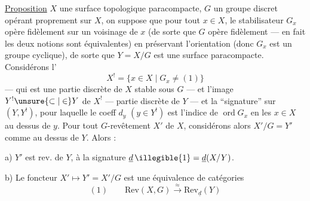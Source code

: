 \uline{Proposition} 
$X$ une surface topologique\unsure{${}^{*}$} paracompacte,
$G$ un groupe discret opérant proprement sur $X$, on suppose que pour tout
$x\in X$, le stabilisateur $G_x$ opère fidèlement sur un voisinage de $x$
(de sorte que $G$ opère fidèlement --- en fait les deux notions sont
équivalentes) en préservant l'orientation  (donc $G_x$ est
un groupe cyclique), de sorte que $Y=X/G$ est une surface paracompacte.
Considérons l'
\[
X^{!}=\{x\in X\mid G_x\ne(1)\}
\]
--- qui est une partie discrète de $X$ stable sous $G$ --- et l'image
$Y^{!}\unsure{\subset|\in}Y$ de $X^{!}$ --- partie discrète de $Y$ --- et
la ``signature'' sur $(Y,Y^{!})$, pour laquelle le coeff $d_y$ $(y\in Y^{!})$
est l'indice de  $\operatorname{ord}G_x$ en les
$x\in X$ au dessus de $y$. Pour tout $G$-revêtement $X'$ de $X$, considérons
alors $X'/G=Y'$ comme  au dessus de $Y$. Alors :


a) $Y'$ est   rev.  de $Y$,  à la signature $\underline d\,\illegible{1}=\underline d(X/Y)$.

b) Le foncteur $X'\longmapsto Y'=X'/G$ est une équivalence de catégories
\[
(1)\qquad \mathrm{Rev}(X,G)\overset{\approx}{\longrightarrow}\mathrm{Rev}_{\underline d}(Y)
\]

